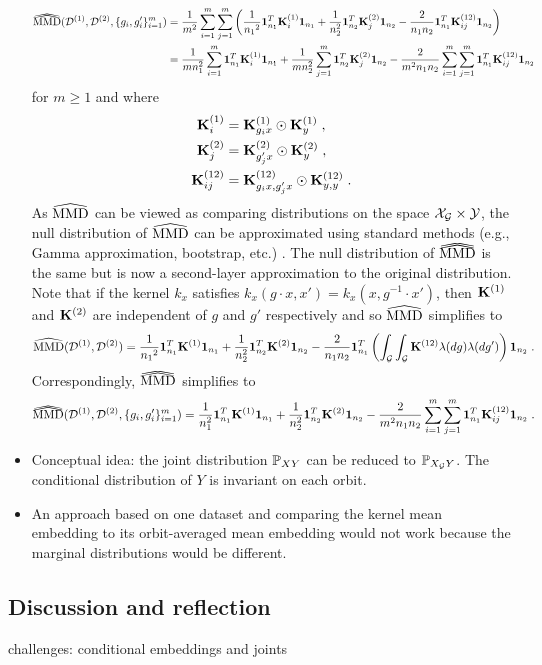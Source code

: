 \begin{itemize}
\begin{align*}
\dhatMMD(\calD^{(1)},\calD^{(2)},\{g_i,g_i'\}_{i=1}^m) &= \frac{1}{m^2}\sum_{i=1}^m\sum_{j=1}^m \left(\frac{1}{{n_1}^2}\onevec_{n_1}^T\bfK_i^{(1)}\onevec_{n_1} + \frac{1}{n_2^2}\onevec_{n_2}^T\bfK_j^{(2)}\onevec_{n_2} - \frac{2}{n_1n_2}\onevec_{n_1}^T\bfK_{ij}^{(12)}\onevec_{n_2}\right) \\
&= \frac{1}{mn_1^2}\sum_{i=1}^m\onevec_{n_1}^T\bfK_i^{(1)}\onevec_{n_1} + \frac{1}{mn_2^2}\sum_{j=1}^m\onevec_{n_2}^T\bfK_j^{(2)}\onevec_{n_2} - \frac{2}{m^2n_1n_2}\sum_{i=1}^m\sum_{j=1}^m\onevec_{n_1}^T\bfK_{ij}^{(12)}\onevec_{n_2}
\end{align*}
for $m\geq 1$ and where
\begin{align*}
\mathbf{K}_i^{(1)} &= \mathbf{K}_{g_ix}^{(1)}\odot \mathbf{K}_y^{(1)} \;, \\
\mathbf{K}_j^{(2)} &= \mathbf{K}_{g_j'x}^{(2)}\odot \mathbf{K}_y^{(2)} \;, \\
\mathbf{K}_{ij}^{(12)} &= \mathbf{K}_{g_ix,g_j'x}^{(12)}\odot \mathbf{K}_{y,y}^{(12)} \;. \\
\end{align*}
As $\widehat{\mathrm{MMD}}$ can be viewed as comparing distributions on the space $\mathcal{X}_{\mathcal{G}}\times\mathcal{Y}$, the null distribution of $\widehat{\mathrm{MMD}}$ can be approximated using standard methods (e.g., Gamma approximation, bootstrap, etc.) \parencite{Gretton:2009}. The null distribution of $\dhatMMD$ is the same but is now a second-layer approximation to the original distribution.
\\

Note that if the kernel $k_x$ satisfies $k_x(g\cdot x,x')=k_x(x,g^{-1}\cdot x')$, then $\mathbf{K}^{(1)}$ and $\mathbf{K}^{(2)}$ are independent of $g$ and $g'$ respectively and so $\widehat{\mathrm{MMD}}$ simplifies to
\[
\widehat{\mathrm{MMD}}(\mathcal{D}^{(1)},\mathcal{D}^{(2)}) = \frac{1}{{n_1}^2}\mathbf{1}_{n_1}^T\mathbf{K}^{(1)}\mathbf{1}_{n_1} + \frac{1}{n_2^2}\mathbf{1}_{n_2}^T\mathbf{K}^{(2)}\mathbf{1}_{n_2} - \frac{2}{n_1n_2}\mathbf{1}_{n_1}^T\left(\int_{\mathcal{G}}\int_{\mathcal{G}}\mathbf{K}^{(12)}\lambda(dg)\lambda(dg')\right)\mathbf{1}_{n_2} \;.
\]
Correspondingly, $\dhatMMD$ simplifies to
\[
\dhatMMD(\calD^{(1)},\calD^{(2)},\{g_i,g_i'\}_{i=1}^m) = \frac{1}{n_1^2}\onevec_{n_1}^T\bfK^{(1)}\onevec_{n_1} + \frac{1}{n_2^2}\onevec_{n_2}^T\bfK^{(2)}\onevec_{n_2} - \frac{2}{m^2n_1n_2}\sum_{i=1}^m\sum_{j=1}^m\onevec_{n_1}^T\bfK_{ij}^{(12)}\onevec_{n_2} \;.
\]

\item
Conceptual idea: the joint distribution $\mathbb{P}_{XY}$ can be reduced to $\mathbb{P}_{X_{\mathcal{G}} Y}$. The conditional distribution of $Y$ is invariant on each orbit.

\item
An approach based on one dataset and comparing the kernel mean embedding to its orbit-averaged mean embedding would not work because the marginal distributions would be different.

\end{itemize}


\subsection{Discussion and reflection} \label{sec:discussion}

\todo challenges: conditional embeddings and joints
